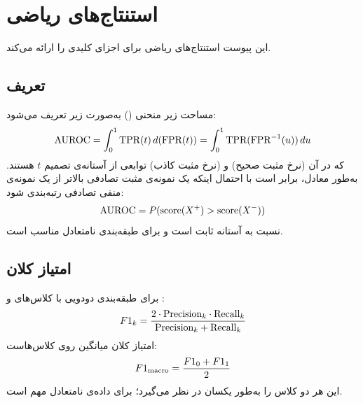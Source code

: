 \chapter{استنتاج‌های ریاضی}
\label{app:math}

این پیوست استنتاج‌های ریاضی برای اجزای کلیدی را ارائه می‌کند.

\section{تعریف }

مساحت زیر منحنی  () به‌صورت زیر تعریف می‌شود:
\begin{equation}
\text{AUROC} = \int_0^1 \text{TPR}(t) \, d(\text{FPR}(t)) = \int_0^1 \text{TPR}(\text{FPR}^{-1}(u)) \, du
\end{equation}
که در آن  (نرخ مثبت صحیح) و  (نرخ مثبت کاذب) توابعی از آستانه‌ی تصمیم $t$ هستند. به‌طور معادل،  برابر است با احتمال اینکه یک نمونه‌ی مثبت تصادفی بالاتر از یک نمونه‌ی منفی تصادفی رتبه‌بندی شود:
\begin{equation}
\text{AUROC} = P(\text{score}(X^+) > \text{score}(X^-))
\end{equation}
 نسبت به آستانه ثابت است و برای طبقه‌بندی نامتعادل مناسب است.

\section{امتیاز  کلان}

برای طبقه‌بندی دودویی با کلاس‌های  و :
\begin{equation}
F1_k = \frac{2 \cdot \text{Precision}_k \cdot \text{Recall}_k}{\text{Precision}_k + \text{Recall}_k}
\end{equation}
امتیاز  کلان میانگین روی کلاس‌هاست:
\begin{equation}
F1_{\text{macro}} = \frac{F1_0 + F1_1}{2}
\end{equation}
این هر دو کلاس را به‌طور یکسان در نظر می‌گیرد؛ برای داده‌ی نامتعادل مهم است.

